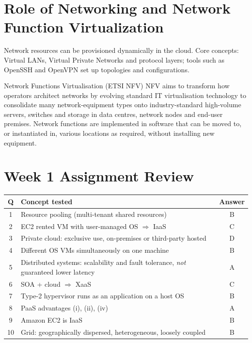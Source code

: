 \documentclass[11pt,a4paper,openany]{report}
\begin{document}
\section{Role of Networking and Network Function Virtualization}
Network resources can be provisioned dynamically in the cloud. Core concepts: Virtual LANs, Virtual
Private Networks and protocol layers; tools such as OpenSSH and OpenVPN set up topologies and
configurations.

\begin{defbox}{Network Functions Virtualisation (ETSI NFV)}
NFV aims to transform how operators architect networks by evolving standard IT virtualisation technology to
consolidate many network-equipment types onto industry-standard high-volume servers, switches and storage in
data centres, network nodes and end-user premises. Network functions are implemented in software that can be
moved to, or instantiated in, various locations as required, without installing new equipment.
\end{defbox}

\section{Week 1 Assignment Review}
\begin{center}
\begin{tabularx}{\textwidth}{cXc}
\toprule
Q & Concept tested & Answer\\
\midrule
1 & Resource pooling (multi-tenant shared resources) & B\\
2 & EC2 rented VM with user-managed OS $\Rightarrow$ IaaS & C\\
3 & Private cloud: exclusive use, on-premises or third-party hosted & D\\
4 & Different OS VMs simultaneously on one machine & B\\
5 & Distributed systems: scalability and fault tolerance, \emph{not} guaranteed lower latency & A\\
6 & SOA + cloud $\Rightarrow$ XaaS & C\\
7 & Type-2 hypervisor runs as an application on a host OS & B\\
8 & PaaS advantages (i), (ii), (iv) & A\\
9 & Amazon EC2 is IaaS & B\\
10 & Grid: geographically dispersed, heterogeneous, loosely coupled & B\\
\bottomrule
\end{tabularx}
\end{center}
\end{document}
